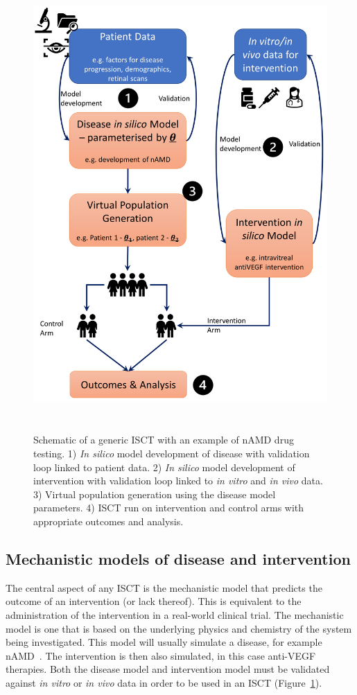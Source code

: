 \documentclass{article}
\begin{document}
\begin{figure}[t!]
  \centering
  \includegraphics[width=.8\textwidth, height=17.3cm]{Fig_sec_8.png}
  \hfill
  \caption{Schematic of a generic ISCT with an example of nAMD drug testing. 1) \textit{In silico} model development of disease with validation loop linked to patient data. 2) \textit{In silico} model development of intervention with validation loop linked to \textit{in vitro} and \textit{in vivo} data. 3) Virtual population generation using the disease model parameters. 4) ISCT run on intervention and control arms with appropriate outcomes and analysis.}
  \label{fig:ISCT}
\end{figure}

\subsection{Mechanistic models of disease and intervention}

The central aspect of any ISCT is the mechanistic model that predicts the outcome of an intervention (or lack thereof). 
This is equivalent to the administration of the intervention in a real-world clinical trial. 
The mechanistic model is one that is based on the underlying physics and chemistry of the system being investigated. 
This model will usually simulate a disease, for example nAMD~\cite{Hoyle_2017}. 
The intervention is then also simulated, in this case anti-VEGF therapies. 
Both the disease model and intervention model must be validated against \textit{in vitro} or \textit{in vivo} data in order to be used in an ISCT (Figure~\ref{fig:ISCT}).
\end{document}
